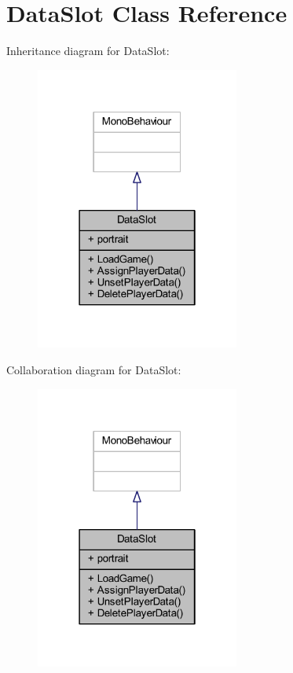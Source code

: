 \hypertarget{class_data_slot}{}\section{Data\+Slot Class Reference}
\label{class_data_slot}


Inheritance diagram for Data\+Slot\+:
\nopagebreak
\begin{figure}[H]
\begin{center}
\leavevmode
\includegraphics[width=190pt]{class_data_slot__inherit__graph}
\end{center}
\end{figure}


Collaboration diagram for Data\+Slot\+:
\nopagebreak
\begin{figure}[H]
\begin{center}
\leavevmode
\includegraphics[width=190pt]{class_data_slot__coll__graph}
\end{center}
\end{figure}
